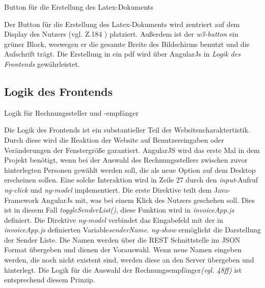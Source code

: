 


\begin{description}
	\item[Button für die Erstellung des Latex-Dokuments]
    \hfill
    \label{des:AddButton}
\end{description}
%
Der Button für die Erstellung des Latex-Dokuments wird zentriert auf dem Display des Nutzers (vgl. Z.184 ) platziert. Außerdem ist der \textit{w3-button} ein grüner Block, weswegen er die gesamte Breite des Bildschirms benutzt und die Aufschrift  trägt. Die Erstellung in ein pdf wird über AngularJs in \textit{Logik des Frontends} gewährleistet.



\subsection{Logik des Frontends}
\label{sec:Logik}


\begin{description}
	\item[Logik für Rechnungssteller und -empfänger]
    \hfill
    \label{des:Logik}
\end{description}
%
Die Logik des Frontends ist ein substantieller Teil der Websitencharaktertistik. Durch diese wird die Reaktion der Website auf Benutzereingaben oder Veränderungen der Fenstergröße garantiert. 
%
AngularJS wird das erste Mal in dem Projekt benötigt, wenn bei der Auswahl des Rechnungsstellers zwischen zuvor hinterlegten Personen gewählt werden soll, die als neue Option auf dem Desktop erscheinen sollen. Eine solche Interaktion wird in Zeile 27 durch den \textit{input}-Aufruf \textit{ng-click} und \textit{ng-model} implementiert.  Die erste Direktive teilt dem Java-Framework AngularJs mit, was bei einem Klick des Nutzers geschehen soll. Dies ist in diesem Fall \textit{toggleSenderList()}, diese Funktion wird in \textit{invoiceApp.js} definiert. Die Direktive \textit{ng-model} verbindet das Eingabefeld mit der in \textit{invoiceApp.js} definierten Variable\textit{senderName}. \textit{ng-show} ermöglicht die Darstellung der Sender Liste. Die Namen werden über die REST Schnittstelle im JSON Format übergeben und dienen der Vorauswahl. Wenn neue Namen eingeben werden, die noch nicht existent sind, werden diese an den Server übergeben und hinterlegt.
Die Logik für die Auswahl der Rechnungsempfänger\textit{(vgl. 48ff)} ist entsprechend diesem Prinzip. 

